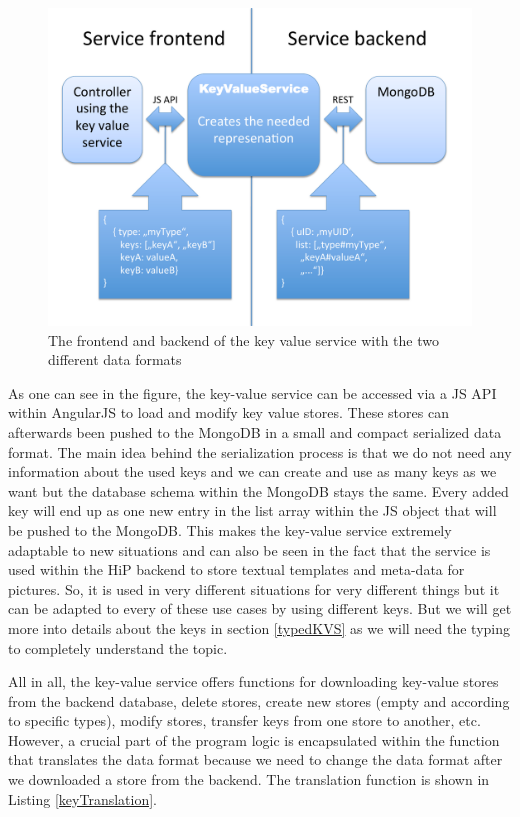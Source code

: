 \begin{figure}[th]
\centerline{\includegraphics[width=1\textwidth]{gfx/kvs}}
\caption{The frontend and backend of the key value service with the two different data formats}
\label{KVS}
\end{figure}

As one can see in the figure, the key-value service can be accessed via a \ac{JS} \ac{API} within AngularJS to load and modify key value stores. These stores can afterwards been pushed to the MongoDB in a small and compact serialized data format. The main idea behind the serialization process is that we do not need any information about the used keys and we can create and use as many keys as we want but the database schema within the MongoDB stays the same. Every added key will end up as one new entry in the list array within the \ac{JS} object that will be pushed to the MongoDB. This makes the key-value service extremely adaptable to new situations and can also be seen in the fact that the service is used within the \ac{HiP} backend to store textual templates and meta-data for pictures. So, it is used in very different situations for very different things but it can be adapted to every of these use cases by using different keys. But we will get more into details about the keys in section \ref{typedKVS} as we will need the typing to completely understand the topic.
 
All in all, the key-value service offers functions for downloading key-value stores from the backend database, delete stores, create new stores (empty and according to specific types), modify stores, transfer keys from one store to another, etc.  
However, a crucial part of the program logic is encapsulated within the function that translates the data format because we need to change the data format after we downloaded a store from the backend. The translation function is shown in Listing \ref{keyTranslation}. 
 
